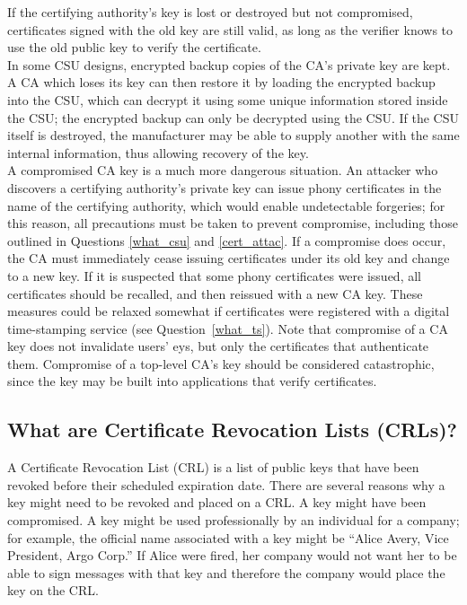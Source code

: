 If the certifying authority's key is lost or destroyed but not
compromised, certificates signed with the old key are still valid, as
long as the verifier knows to use the old public key to verify the
certificate.\\

In some CSU designs, encrypted backup copies of the CA's private key
are kept. A CA which loses its key can then restore it by loading the
encrypted backup into the CSU, which can decrypt it using some unique
information stored inside the CSU; the encrypted backup can only be
decrypted using the CSU. If the CSU itself is destroyed, the
manufacturer may be able to supply another with the same internal
information, thus allowing recovery of the key.\\

A compromised CA key is a much more dangerous situation. An attacker who
discovers a certifying authority's private key can issue phony certificates
in the name of the certifying authority, which would enable undetectable
forgeries; for this reason, all precautions must be taken to prevent
compromise, including those outlined in Questions \ref{what_csu} and
\ref{cert_attac}. If a compromise does occur, the CA must immediately cease
issuing certificates under its old key and change to a new key. If it is
suspected that some phony certificates were issued, all certificates should
be recalled, and then reissued with a new CA key. These measures could be
relaxed somewhat if certificates were registered with a digital
time-stamping service (see Question~\ref{what_ts}). Note that compromise of
a CA key does not invalidate users' eys, but only the certificates that
authenticate them. Compromise of a top-level CA's key should be considered
catastrophic, since the key may be built into applications that verify
certificates.

\subsection{What are Certificate Revocation Lists (CRLs)?}
\label{what_crl}

A Certificate Revocation List (CRL) is a list of public keys that have
been revoked before their scheduled expiration date. There are several
reasons why a key might need to be revoked and placed on a CRL. A key
might have been compromised. A key might be used professionally by an
individual for a company; for example, the official name associated
with a key might be ``Alice Avery, Vice President, Argo Corp.'' If
Alice were fired, her company would not want her to be able to sign
messages with that key and therefore the company would place the key on
the CRL.\\

